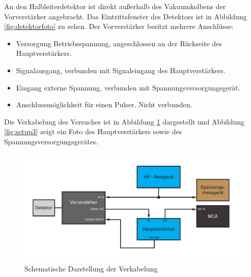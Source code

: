 An den Halbleiterdetektor ist direkt außerhalb des Vakuumkolbens der Vorverstärker angebracht. Das Eintrittsfenster des Detektors ist in Abbildung \ref{fig:detektorfoto} zu sehen. Der Vorverstärker besitzt mehrere Anschlüsse: 
\begin{itemize}[itemsep=0pt]
	\item Versorgung Betriebsspannung, angeschlossen an der Rückseite des Hauptverstärkers. 
	\item Signalausgang, verbunden mit Signaleingang des Hauptverstärkers.
	\item Eingang externe Spannung, verbunden mit Spannungsversorgungsgerät.
	\item Anschlussmöglichkeit für einen Pulser. Nicht verbunden.
\end{itemize}
Die Verkabelung des Versuches ist in Abbildung \ref{fig:verkabelung} dargestellt und Abbildung \ref{fig:setup3} zeigt ein Foto des Hauptverstärkers sowie des Spannungsversorgungsgerätes.
%
\begin{figure}[h]
	\centering
	\includegraphics[width=\linewidth]{img/verkabelung}
	\caption{Schematische Darstellung der Verkabelung}
	\label{fig:verkabelung}
\end{figure}

